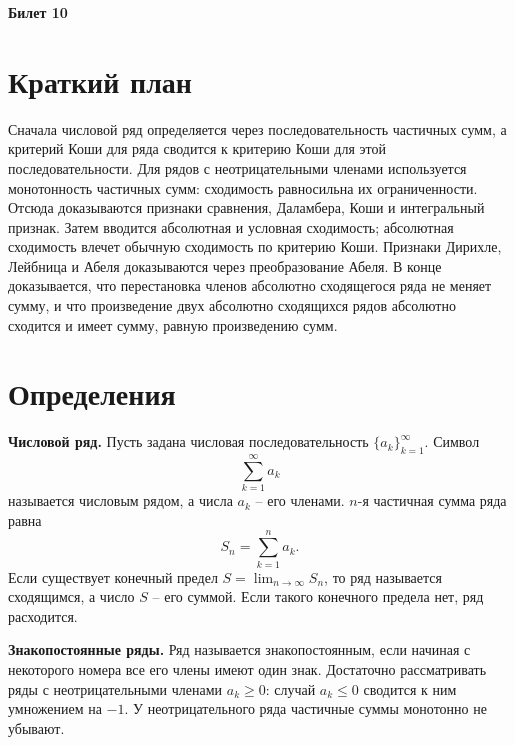 \documentclass[12pt,a4paper]{article}
\begin{document}
\begin{center}
{\Large\bfseries Билет 10}
\end{center}

\noindent{}

\section*{Краткий план}

Сначала числовой ряд определяется через последовательность частичных сумм, а
критерий Коши для ряда сводится к критерию Коши для этой последовательности.
Для рядов с неотрицательными членами используется монотонность частичных сумм:
сходимость равносильна их ограниченности. Отсюда доказываются признаки
сравнения, Даламбера, Коши и интегральный признак. Затем вводится абсолютная и
условная сходимость; абсолютная сходимость влечет обычную сходимость по
критерию Коши. Признаки Дирихле, Лейбница и Абеля доказываются через
преобразование Абеля. В конце доказывается, что перестановка членов
абсолютно сходящегося ряда не меняет сумму, и что произведение двух абсолютно
сходящихся рядов абсолютно сходится и имеет сумму, равную произведению сумм.

\section*{Определения}

\textbf{Числовой ряд.}
Пусть задана числовая последовательность \(\{a_k\}_{k=1}^\infty\). Символ
\[
  \sum_{k=1}^{\infty} a_k
\]
называется числовым рядом, а числа \(a_k\) -- его членами. \(n\)-я частичная
сумма ряда равна
\[
  S_n=\sum_{k=1}^{n}a_k.
\]
Если существует конечный предел \(S=\lim_{n\to\infty}S_n\), то ряд называется
сходящимся, а число \(S\) -- его суммой. Если такого конечного предела нет,
ряд расходится.

\textbf{Знакопостоянные ряды.}
Ряд называется знакопостоянным, если начиная с некоторого номера все его
члены имеют один знак. Достаточно рассматривать ряды с неотрицательными
членами \(a_k\ge0\): случай \(a_k\le0\) сводится к ним умножением на \(-1\).
У неотрицательного ряда частичные суммы монотонно не убывают.
\end{document}
